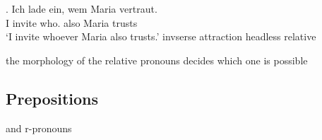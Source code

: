 \exg. Ich {lade ein}, wem Maria vertraut. \\
I invite who. also Maria trusts\\
`I invite whoever Maria also trusts.' \hfill invserse attraction headless relative

the morphology of the relative pronouns decides which one is possible



\subsection{Prepositions}

and r-pronouns
